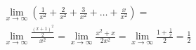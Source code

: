 \begin{ex}
\begin{align}
&\lim_{x\rightarrow \infty} \left(\frac{1}{x^2}+\frac{2}{x^2}+\frac{3}{x^2}+\dots+\frac{x}{x^2}\right)=\nonumber\\
&\lim_{x\rightarrow \infty} \frac{\frac{(x+1)^2}{2}}{x^2}=\lim_{x\rightarrow \infty} \frac{x^2+x}{2x^2}=\lim_{x\rightarrow \infty} \frac{1+\frac{1}{x}}{2}=\frac{1}{2}\nonumber
\end{align}
\end{ex}
